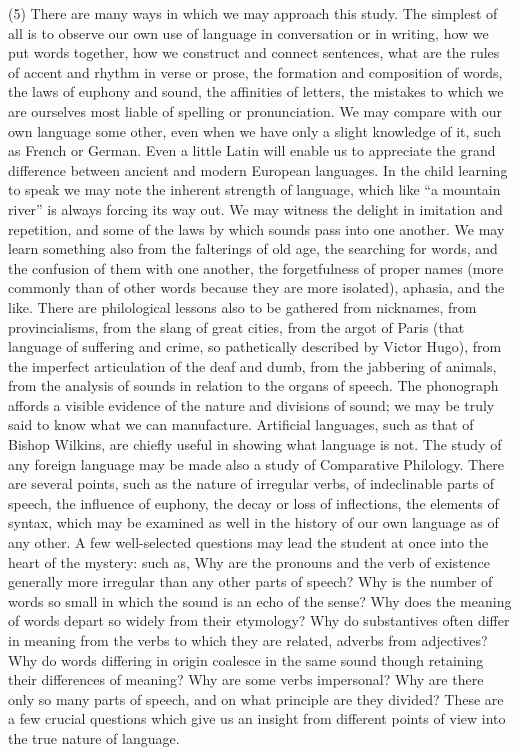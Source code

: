 \documentclass[11pt,letter]{article}
\begin{document}
\par  (5) There are many ways in which we may approach this study. The simplest of all is to observe our own use of language in conversation or in writing, how we put words together, how we construct and connect sentences, what are the rules of accent and rhythm in verse or prose, the formation and composition of words, the laws of euphony and sound, the affinities of letters, the mistakes to which we are ourselves most liable of spelling or pronunciation. We may compare with our own language some other, even when we have only a slight knowledge of it, such as French or German. Even a little Latin will enable us to appreciate the grand difference between ancient and modern European languages. In the child learning to speak we may note the inherent strength of language, which like “a mountain river” is always forcing its way out. We may witness the delight in imitation and repetition, and some of the laws by which sounds pass into one another. We may learn something also from the falterings of old age, the searching for words, and the confusion of them with one another, the forgetfulness of proper names (more commonly than of other words because they are more isolated), aphasia, and the like. There are philological lessons also to be gathered from nicknames, from provincialisms, from the slang of great cities, from the argot of Paris (that language of suffering and crime, so pathetically described by Victor Hugo), from the imperfect articulation of the deaf and dumb, from the jabbering of animals, from the analysis of sounds in relation to the organs of speech. The phonograph affords a visible evidence of the nature and divisions of sound; we may be truly said to know what we can manufacture. Artificial languages, such as that of Bishop Wilkins, are chiefly useful in showing what language is not. The study of any foreign language may be made also a study of Comparative Philology. There are several points, such as the nature of irregular verbs, of indeclinable parts of speech, the influence of euphony, the decay or loss of inflections, the elements of syntax, which may be examined as well in the history of our own language as of any other. A few well-selected questions may lead the student at once into the heart of the mystery: such as, Why are the pronouns and the verb of existence generally more irregular than any other parts of speech? Why is the number of words so small in which the sound is an echo of the sense? Why does the meaning of words depart so widely from their etymology? Why do substantives often differ in meaning from the verbs to which they are related, adverbs from adjectives? Why do words differing in origin coalesce in the same sound though retaining their differences of meaning? Why are some verbs impersonal? Why are there only so many parts of speech, and on what principle are they divided? These are a few crucial questions which give us an insight from different points of view into the true nature of language.
\end{document}

